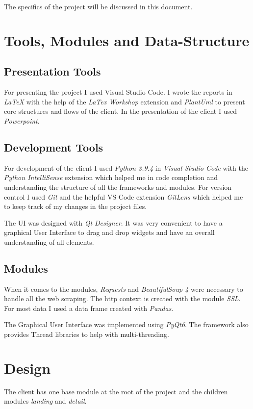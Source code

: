 \documentclass[12pt]{article}
\begin{document}
The specifics of the project will be discussed in this document.

\section{Tools, Modules and Data-Structure}
\subsection{Presentation Tools}
For presenting the project I used Visual Studio Code. I wrote the reports in \textit{\LaTeX} with the help of the \textit{LaTex Workshop} extension and 
\textit{PlantUml} to present core structures and flows of the client.
In the presentation of the client I used \textit{Powerpoint}. 

\subsection{Development Tools}
For development of the client I used \textit{Python 3.9.4} in \textit{Visual Studio 
Code} with the \textit{Python IntelliSense} extension which helped me in code 
completion and understanding the structure of all the frameworks and modules. For 
version control I used \textit{Git} and the helpful VS Code extension 
\textit{GitLens} which helped me to keep track of my changes in the project files.

The UI was designed with \textit{Qt Designer}. It was very convenient to
have a graphical User Interface to drag and drop widgets and have an overall 
understanding of all elements.

\subsection{Modules}
When it comes to the modules, \textit{Requests} and \textit{BeautifulSoup 4} were  
necessary to handle all the web scraping. The http context is created with the 
module \textit{SSL}. For most data I used a data frame created with \textit{Pandas}.

The Graphical User Interface was implemented using \textit{PyQt6}. The framework also
provides Thread libraries to help with multi-threading.

\section{Design}
The client has one base module at the root of the project and the children modules 
\textit{landing} and \textit{detail}.
\end{document}
